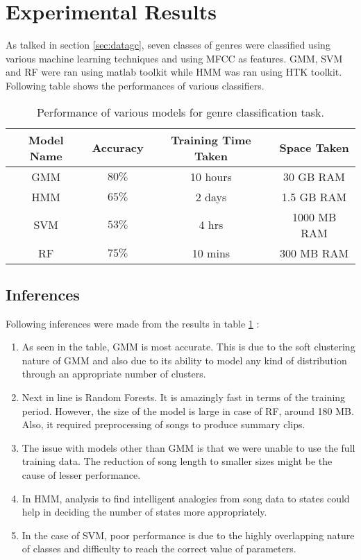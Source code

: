 \section{Experimental Results}
As talked in section \ref{sec:datagc}, seven classes of genres were classified using various machine learning techniques and using MFCC as features. GMM, SVM and RF were ran using matlab toolkit while HMM was ran using HTK toolkit. Following table shows the performances of various classifiers.
\begin{table}[!htbp]
\centering


\begin{tabular}{|c|c|c|c|} 
\hline
 Model Name & Accuracy & Training Time Taken & Space Taken  \\ \hline
 GMM & $80\%$ & 10 hours & 30 GB RAM \\ \hline
 HMM & $65\%$ & 2 days & 1.5 GB RAM \\ \hline
 SVM & $53\%$ & 4 hrs  & 1000 MB RAM \\ \hline
 RF & $75\%$   &  10 mins & 300 MB RAM  \\ \hline
\end{tabular}
\caption{Performance of various models for genre classification task.}
\label{table:perf1}	
	\end{table}
	\pagebreak
\subsection{Inferences}
Following inferences were made from the results in table \ref{table:perf1} :
\begin{enumerate} %
\item As seen in the table, GMM is most accurate. This is due to the soft clustering nature of GMM and also due to its ability to model any kind of distribution through an appropriate number of clusters. 
\item Next in line is Random Forests. It is amazingly fast in terms of the training period. However, the size of the model is large in case of RF, around 180 MB. Also, it required preprocessing of songs to produce summary clips.
\item The issue with models other than GMM is that we were unable to use the full training data. The reduction of song length to smaller sizes might be the cause of lesser performance. 
\item In HMM, analysis to find intelligent analogies from song data to states could help in deciding			 the number of states more appropriately.
\item In the case of SVM, poor performance is due to the highly overlapping nature of classes and difficulty to reach the correct value of parameters.
\end{enumerate}
